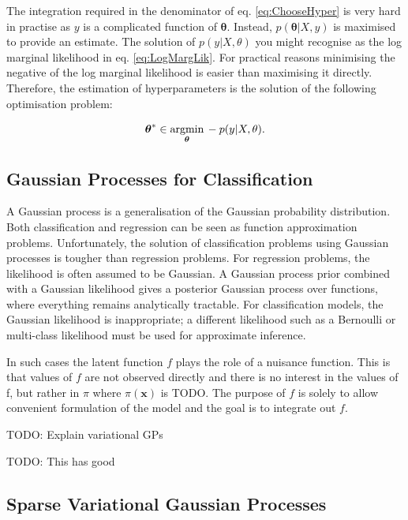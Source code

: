 \documentclass[12pt,a4paper]{report}
\theoremstyle{definition}
\begin{document}
The integration required in the denominator of eq. \ref{eq:ChooseHyper} is very hard in practise as $y$ is a complicated function of $\boldsymbol{\theta}$. 
Instead, $p(\boldsymbol{\theta} | X, y)$ is maximised to provide an estimate.
The solution of $p(y | X, \theta)$ you might recognise as the log marginal likelihood in eq. \ref{eq:LogMargLik}. 
For practical reasons minimising the negative of the log marginal likelihood is easier than maximising it directly.
Therefore, the estimation of hyperparameters is the solution of the following optimisation problem:

\begin{equation}
	\centering
	\boldsymbol{\theta}^* \in \underset{\boldsymbol{\theta}}{\textrm{argmin}} \, -p(y | X, \theta).
\end{equation}

\subsection{Gaussian Processes for Classification}

A Gaussian process is a generalisation of the Gaussian probability distribution. 
Both classification and regression can be seen as function approximation problems. 
Unfortunately, the solution of classification problems using Gaussian processes is tougher than regression problems. 
For regression problems, the likelihood is often assumed to be Gaussian. 
A Gaussian process prior combined with a Gaussian likelihood gives a posterior Gaussian process over functions, where everything remains analytically tractable. 
For classification models, the Gaussian likelihood is inappropriate; a different likelihood such as a Bernoulli or multi-class likelihood must be used for approximate inference.

In such cases the latent function $f$ plays the role of a nuisance function. 
This is that values of $f$ are not observed directly and there is no interest in the values of f, but rather in $\pi$ where $\pi (\textbf{x})$ is TODO.
The purpose of $f$ is solely to allow convenient formulation of the model and the goal is to integrate out $f$.

TODO: Explain variational GPs

TODO: This has good \citep{Yi2020}

\subsection{Sparse Variational Gaussian Processes}
\end{document}
